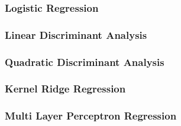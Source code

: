 \subsubsection{Logistic Regression}%
\label{ssub:logistic-regression}

\subsubsection{Linear Discriminant Analysis}%
\label{ssub:linear-discriminant-analysis}

\subsubsection{Quadratic Discriminant Analysis}%
\label{ssub:quadratic-discriminant-analysis}

\subsubsection{Kernel Ridge Regression}%
\label{ssub:kernel-ridge-regression}

\subsubsection{Multi Layer Perceptron Regression}%
\label{ssub:multi-layer-perceptron-regression}
